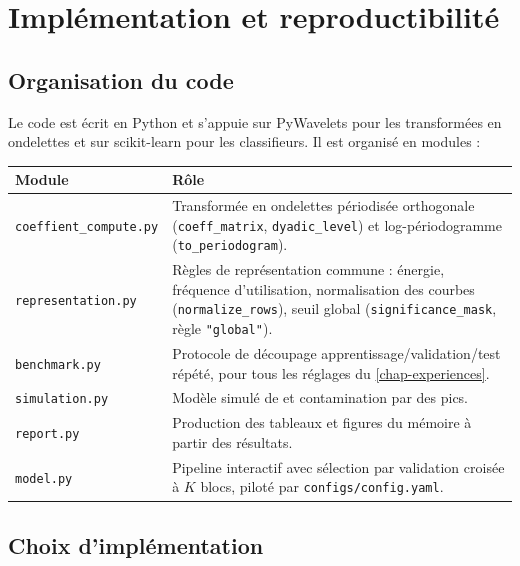 \appendix
\chapter{Implémentation et reproductibilité}\label{chap-implementation}

\section{Organisation du code}

Le code est écrit en Python et s'appuie sur PyWavelets \citep{lee2019pywavelets} pour les transformées en ondelettes et sur scikit-learn \citep{pedregosa2011scikit} pour les classifieurs. Il est organisé en modules :

\begin{center}
\small
\begin{tabular}{@{}p{4.6cm}p{9.6cm}@{}}
\toprule
Module & Rôle \\
\midrule
\texttt{coeffient\_compute.py} & Transformée en ondelettes périodisée orthogonale (\texttt{coeff\_matrix}, \texttt{dyadic\_level}) et log-périodogramme (\texttt{to\_periodogram}). \\
\texttt{representation.py} & Règles de représentation commune : énergie, fréquence d'utilisation, normalisation des courbes (\texttt{normalize\_rows}), seuil global (\texttt{significance\_mask}, règle \texttt{"global"}). \\
\texttt{benchmark.py} & Protocole de découpage apprentissage/validation/test répété, pour tous les réglages du \cref{chap-experiences}. \\
\texttt{simulation.py} & Modèle simulé de \citet[section 3.2]{berlinet2008functional} et contamination par des pics. \\
\texttt{report.py} & Production des tableaux et figures du mémoire à partir des résultats. \\
\texttt{model.py} & Pipeline interactif avec sélection par validation croisée à $K$ blocs, piloté par \texttt{configs/config.yaml}. \\
\bottomrule
\end{tabular}
\end{center}

\section{Choix d'implémentation}


